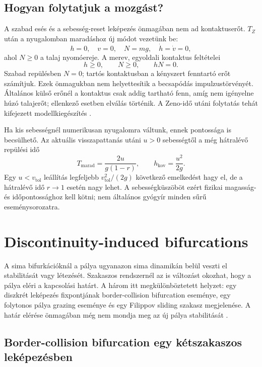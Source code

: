 \subsection{Hogyan folytatjuk a mozgást?}
A szabad esés és a sebesség-reset leképezés önmagában nem ad kontaktuserőt. $T_Z$ után a nyugalomban maradáshoz új módot vezetünk be:
\begin{equation}
h=0,\quad v=0,\quad N=mg,\quad \dot h=\dot v=0,
\end{equation}
ahol $N\geq0$ a talaj nyomóereje. A merev, egyoldali kontaktus feltételei
\begin{equation}\label{eq:contact_complementarity}
h\geq0,\qquad N\geq0,\qquad hN=0.
\end{equation}
Szabad repülésben $N=0$; tartós kontaktusban a kényszert fenntartó erőt számítjuk. Ezek önmagukban nem helyettesítik a becsapódás impulzustörvényét. Általános külső erőnél a kontaktus csak addig tartható fenn, amíg nem igényelne húzó talajerőt; ellenkező esetben elválás történik. A Zeno-idő utáni folytatás tehát kifejezett modellkiegészítés \cite{goebel_sanfelice}.

Ha kis sebességnél numerikusan nyugalomra váltunk, ennek pontossága is becsülhető. Az aktuális visszapattanás utáni $u>0$ sebességtől a még hátralévő repülési idő
\[
T_{\mathrm{marad}}=\frac{2u}{g(1-r)},\qquad
h_{\mathrm{kov}}=\frac{u^2}{2g}.
\]
Egy $u<v_{\mathrm{tol}}$ leállítás legfeljebb $v_{\mathrm{tol}}^2/(2g)$ következő emelkedést hagy el, de a hátralévő idő $r\to1$ esetén nagy lehet. A sebességküszöböt ezért fizikai magasság- és időpontossághoz kell kötni; nem általános gyógyír minden sűrű eseménysorozatra.

\section{Discontinuity-induced bifurcations}\label{sec:boundary_bifs}
A sima bifurkációknál a pálya ugyanazon sima dinamikán belül veszti el stabilitását vagy létezését. Szakaszos rendszernél az is változást okozhat, hogy a pálya eléri a kapcsolási határt. A három itt megkülönböztetett helyzet: egy diszkrét leképezés fixpontjának border-collision bifurcation eseménye, egy folytonos pálya grazing eseménye és egy Filippov sliding szakasz megjelenése. A határ elérése önmagában még nem mondja meg az új pálya stabilitását \cite{champneys_dib}.

\subsection{Border-collision bifurcation egy kétszakaszos leképezésben}
\examplebody


